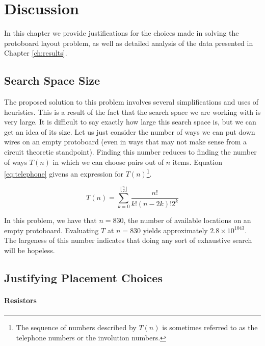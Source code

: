 
\chapter{Discussion}
\label{ch:discussion}

In this chapter we provide justifications for the choices made in solving the
protoboard layout problem, as well as detailed analysis of the data presented in
Chapter \ref{ch:results}.

\section{Search Space Size}
\label{sec:search_space_size}

The proposed solution to this problem involves several simplifications and uses
of heuristics. This is a result of the fact that the search space we are working
with is very large. It is difficult to say exactly how large this search space
is, but we can get an idea of its size. Let us just consider the number of ways
we can put down wires on an empty protoboard (even in ways that may not make
sense
from a circuit theoretic standpoint). Finding this number reduces to finding the
number of ways $T(n)$ in which we can choose pairs out of $n$ items. Equation
\ref{eq:telephone} givens an expression for $T(n)$\footnote{The sequence of
numbers described by $T(n)$ is sometimes referred to as the telephone numbers
or the involution numbers.}.

\begin{equation}
T(n) = \sum_{k = 0}^{\lfloor \frac{n}{2} \rfloor}{\frac{n!}{k! (n - 2k)! 2^k}}
\label{eq:telephone}
\end{equation}

In this problem, we have that $n = 830$, the number of available locations on an
empty protoboard. Evaluating $T$ at $n = 830$ yields approximately
$2.8\times10^{1043}$.
The largeness of this number indicates that doing any sort of exhaustive search
will be hopeless.

\section{Justifying Placement Choices}
\label{sec:justify_placement}

\subsubsection{Resistors}

